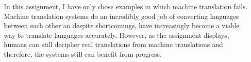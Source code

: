 \documentclass{article}
\begin{document}
\begin{enumerate}
In this assignment, I have only chose examples in which machine translation fails.
Machine translation systems do an incredibly good job of converting languages between
each other an despite shortcomings, have increasingly become a viable way to 
translate languages accurately. However, as the assignment displays, humans can still
decipher real translations from machine translations and therefore, the systems still
can benefit from progress.

\end{enumerate}
\end{document}
